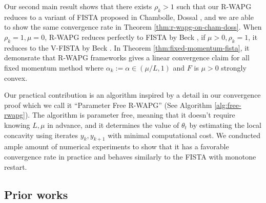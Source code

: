 \documentclass[12pt]{article}
\begin{document}
        Our second main result shows that there exists $\rho_k > 1$ such that our R-WAPG reduces to a variant of FISTA proposed in Chambolle, Dossal \cite{chambolle_convergence_2015}, and we are able to show the same convergence rate in Theorem \ref{thm:r-wapg-on-cham-doss}. 
        When $\rho_k = 1, \mu = 0$, R-WAPG reduces perfectly to FISTA by Beck \cite{beck_first-order_2017}, if $\mu > 0, \rho_k = 1$, it reduces to the V-FISTA by Beck \cite{beck_first-order_2017}. 
        In Theorem \ref{thm:fixed-momentum-fista}, it demonsrate that R-WAPG frameworks gives a linear convergence claim for all fixed momentum method where $\alpha_k := \alpha \in (\mu/L, 1)$ and  $F$ is $\mu > 0$ strongly convex. 
        \par
        Our practical contribution is an algorithm inspired by a detail in our convergence proof which we call it ``Parameter Free R-WAPG'' (See Algorithm \ref{alg:free-rwapg}). 
        The algorithm is parameter free, meaning that it doesn't require knowing $L, \mu$ in advance, and it determines the value of $\theta_t$ by estimating the local concavity using iterates $y_{k}, y_{k + 1}$ with minimal computational cost. 
        We conducted ample amount of numerical experiments to show that it has a favorable convergence rate in practice and behaves similarly to the FISTA with monotone restart. 
    \subsection{Prior works}
        
\end{document}
